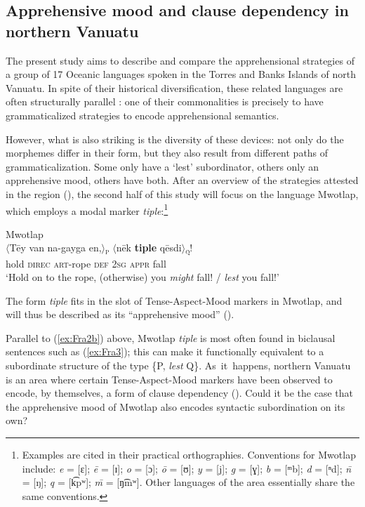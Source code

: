 \documentclass[output=paper,colorlinks,citecolor=brown]{langscibook}
\begin{document}
\subsection{Apprehensive mood and clause dependency in northern Vanuatu}
\label{subsec:moodandclause}

 
The present study aims to describe and compare the apprehensional strategies of a group of 17 Oceanic languages spoken in the Torres and Banks Islands of north Vanuatu. In spite of their historical diversification, these related languages are often structurally parallel \citep{François2011}: one of their commonalities is precisely to have grammaticalized strategies to encode apprehensional semantics.

However, what is also striking is the diversity of these devices: not only do the morphemes differ in their form, but they also result from different paths of grammaticalization. Some only have a ‘lest’ subordinator, others only an apprehensive mood, others have both. After an overview of the strategies attested in the region (), the second half of this study will focus on the language Mwotlap, which employs a modal marker \textit{tiple}:\footnote{Examples are cited in their practical orthographies. Conventions for Mwotlap include:  \textit{e} = [\textsf{ɛ}]; \textit{ē} = [\textsf{ɪ}]; \textit{o} = [\textsf{ɔ}]; \textit{ō} = [\textsf{ʊ}]; \textit{y} = [\textsf{j}]; \textit{g} = [\textsf{ɣ}]; \textit{b} = [\textsf{ᵐb}]; \textit{d} = [\textsf{ⁿd}]; \textit{\={n}} = [\textsf{ŋ}]; \textit{q} = [\textsf{k͡pʷ}]; \textit{\={m}} = [\textsf{ŋ͡mʷ}]. Other languages of the area essentially share the same conventions.}
 
\ea \label{ex:Fra3} \textnormal{Mwotlap}\\
\gll ${\langle}$Tēy van na-gayga en,${\rangle}$\textnormal{\textsc{\textsubscript{p}}} ${\langle}$nēk \textbf{tiple} qēsdi${\rangle}$\textnormal{\textsc{\textsubscript{q}}}! \\
hold \textsc{direc} \textsc{art}-rope \textsc{def} \textsc{2sg} \textsc{appr} fall \\
\glt `Hold on to the rope, (otherwise) you \textit{might} fall! / \textit{lest} you fall!'
\z
 
\noindent The form \textit{tiple} fits in the slot of Tense-Aspect-Mood markers in Mwotlap, and will thus be described as its ``apprehensive mood'' (\citealt[130]{François2005a}).

Parallel to (\ref{ex:Fra2b}) above, Mwotlap \textit{tiple} is most often found in biclausal sentences such as (\ref{ex:Fra3}); this can make it functionally equivalent to a subordinate structure of the type \{P, \textit{lest} Q\}. As~it~happens, northern Vanuatu is an area where certain Tense-Aspect-Mood markers have been observed to encode, by themselves, a form of clause dependency (). Could it be the case that the apprehensive mood of Mwotlap also encodes syntactic subordination on its own?
\end{document}
